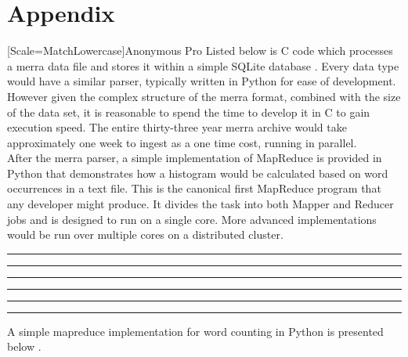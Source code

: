 \section{Appendix}
\newfontfamily{\anonymous}[Scale=MatchLowercase]{Anonymous Pro}
\lstset{ %
    language=C,                             %
    basicstyle=\anonymous,
    tabsize=1,
    breaklines=true,
    breakatwhitespace=false,
    showstringspaces=false,
    showspaces=false,
    showtabs=false
}
Listed below is C code which processes a \gls{merra} data file and stores it within a simple SQLite database \cite{hdf}. Every data type would have a similar parser, typically written in Python for ease of development. However given the complex structure of the \gls{merra} format, combined with the size of the data set, it is reasonable to spend the time to develop it in C to gain execution speed.  The entire thirty-three year \gls{merra} archive would take approximately one week to ingest as a one time cost, running in parallel. \\

After the \gls{merra} parser, a simple implementation of MapReduce is provided in Python that demonstrates how a histogram would be calculated based on word occurrences in a text file.  This is the canonical first MapReduce program that any developer might produce. It divides the task into both Mapper and Reducer jobs and is designed to run on a single core. More advanced implementations would be run over multiple cores on a distributed cluster.
 

\hrule

\hrule

\hrule

\hrule

\hrule

\hrule

\lstset{ %
    language=Python,                             %
    basicstyle=\anonymous,
    tabsize=1,
    breaklines=true,
    breakatwhitespace=false,
    showstringspaces=false,
    showspaces=false,
    showtabs=false
}
A simple mapreduce implementation for word counting in Python is presented below \cite{keller2}.

